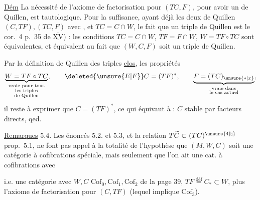 
\uline{Dém} La nécessité de l'axiome de factorisation
pour $(TC,F)$, pour avoir un  de Quillen,
est tautologique. Pour la suffisance, ayant
déjà les deux  de Quillen $(C,TF),(TC,F)$
avec
, et $TC=C\cap W$, le fait que  
un triple de Quillen est le cor.~4 p.~35
de $\overline{\underline{\mathrm{XV}}}$) : les conditions $TC=C\cap W$, $TF=F\cap W$,
$W=TF\circ TC$ sont équivalentes, et équivalent au
fait que $(W,C,F)$ soit un triple de Quillen.

Par la définition de Quillen des triples \uline{clos},
 les propriétés
\[
\underbrace{W=TF\circ TC}_{\substack{\text{vraie pour tous}\\\text{les triples}\\\text{de Quillen}}},\qquad
\deleted{\unsure{E|F}}C=(TF)^{*},\qquad
\underbrace{F=(TC)_{\unsure{*|x}}}_{\substack{\text{vraie dans}\\\text{le cas actuel}}},
\]
il reste à exprimer que $C=(TF)^{*}$, ce qui
équivaut à : $C$ stable par facteurs directs,
qed.

\uline{Remarques} 5.4. Les  énoncés 5.2. et 5.3,
et la relation $T\widetilde C\subset (TC)^{\unsure{4|\natural}}$  prop.~5.1,
ne font pas appel à la totalité de l'hypothèse que $(M,W,C)$ soit une catégorie à cofibrations spéciale, mais seulement que l'on ait
une cat. à cofibrations avec
\unsure{;|,}


i.e. une catégorie avec $W,C$  
$\mathrm{Cof}_{0},\mathrm{Cof}_{1},\mathrm{Cof}_{2}$ de la page 39,  $TF\overset{\mathrm{déf}}=C_{*}\subset W$,
plus l'axiome de factorisation pour $(C,TF)$
(lequel implique $\mathrm{Cof}_{3}$).

